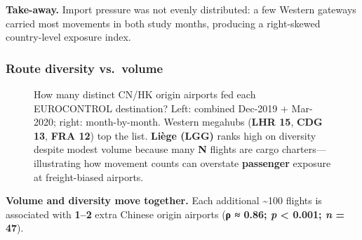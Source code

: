 \documentclass[
  authoryear,
  preprint,
  3p,
  onecolumn]{elsarticle}
\begin{document}
\textbf{Take-away.} Import pressure was not evenly distributed: a few
Western gateways carried most movements in both study months, producing
a right-skewed country-level exposure index.

\subsubsection{Route diversity
vs.~volume}\label{route-diversity-vs.-volume}

\label{cell-fig-origins_per_destination}
\begin{figure}[H]


\caption{\label{fig-origins_per_destination}How many distinct CN/HK
origin airports fed each EUROCONTROL destination? Left: combined
Dec-2019 + Mar-2020; right: month-by-month. Western megahubs
(\textbf{LHR 15}, \textbf{CDG 13}, \textbf{FRA 12}) top the list.
\textbf{Liège (LGG)} ranks high on diversity despite modest volume
because many \textbf{N} flights are cargo charters---illustrating how
movement counts can overstate \textbf{passenger} exposure at
freight-biased airports.}

\end{figure}%

\textbf{Volume and diversity move together.} Each additional
\textasciitilde100 flights is associated with \textbf{1--2} extra
Chinese origin airports (\textbf{ρ ≈ 0.86; \emph{p} \textless{} 0.001;
\emph{n} = 47}).
\end{document}
